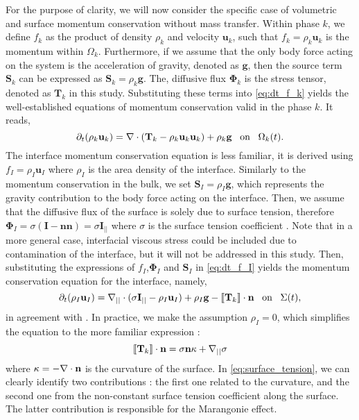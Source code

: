 For the purpose of clarity, we will now consider the specific case of volumetric and surface momentum conservation without mass transfer.
Within phase $k$, we define $f_k$ as the product of density $\rho_k$ and velocity $\textbf{u}_k$, such that $f_k = \rho_k \textbf{u}_k$ is the momentum within $\Omega_k$.
Furthermore, if we assume that the only body force acting on the system is the acceleration of gravity, denoted as $\textbf{g}$, then the source term $\textbf{S}_k$ can be expressed as $\textbf{S}_k = \rho_k \textbf{g}$.
The, diffusive flux $\mathbf{\Phi}_k$ is the stress tensor, denoted as $\textbf{T}_k$ in this study. 
Substituting these terms into \ref{eq:dt_f_k} yields the well-established equations of momentum conservation valid in the phase $k$. 
It reads, 
\begin{equation}
    \partial_t (\rho_k\textbf{u}_k)  
    = 
    \mathbf{\nabla} \cdot (\textbf{T}_k - \rho_k\textbf{u}_k\textbf{u}_k)
    + \rho_k \textbf{g}
     \;\;\; \text{on} \;\;\;\Omega_k(t).
     \label{eq:dt_rhou_k}
\end{equation} 
The interface momentum conservation equation is less familiar, it is derived using $f_I = \rho_I \textbf{u}_I$ \citep{morel2015mathematical} where $\rho_I$ is the area density of the interface. 
Similarly to the momentum conservation in the bulk, we set $\textbf{S}_I = \rho_I \textbf{g}$, which represents the gravity contribution to the body force acting on the interface. 
Then, we assume that the diffusive flux of the surface is solely due to surface tension, therefore $\mathbf{\Phi}_I  = \sigma (\textbf{I} - \textbf{nn}) = \sigma \textbf{I}_{||}$ where $\sigma$ is the surface tension coefficient \citep[Chapter 2]{tryggvason2011direct}.  
Note that in a more general case, interfacial viscous stress could be included \citep{brenner2013interfacial,slattery2007interfacial} due to contamination of the interface, but it will not be addressed in this study. 
Then, substituting the expressions of $f_I$,$\mathbf{\Phi}_I$ and $\textbf{S}_I$ in \ref{eq:dt_f_I} yields the momentum conservation equation for the interface, namely,
\begin{equation*}
    \partial_t (\rho_I\textbf{u}_I)  
    = 
    \mathbf{\nabla}_{||} \cdot (\sigma \textbf{I}_{||} - \rho_I\textbf{u}_I)
    + \rho_I \textbf{g}
    - \llbracket 
        \mathbf{T}_k
     \rrbracket \cdot \textbf{n} \;\;\; \text{on} \;\;\;\Sigma(t),
\end{equation*} 
in agreement with \citet{manikantan2020surfactant}. 
In practice, we make the assumption $\rho_I = 0$, which simplifies the equation to the more familiar expression :
\begin{equation}
    \llbracket \textbf{T}_k \rrbracket \cdot \textbf{n} 
    =
    \sigma\textbf{n}\kappa
    + \mathbf{\nabla}_{||}\sigma 
    \label{eq:surface_tension}
\end{equation}
where $\kappa = - \mathbf{\nabla}\cdot\textbf{n}$ is the curvature of the surface.
In \ref{eq:surface_tension}, we can clearly identify two contributions : the first one related to the curvature, and the second one from the non-constant surface tension coefficient along the surface. 
The latter contribution is responsible for the Marangonie effect.


